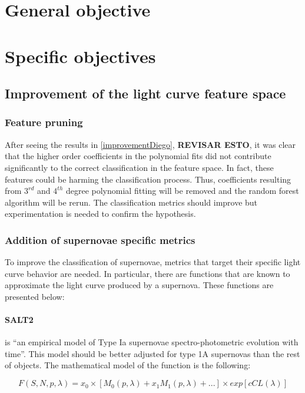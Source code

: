 \section{General objective}
\section{Specific objectives}

\subsection{Improvement of the light curve feature space}

\subsubsection{Feature pruning}

After seeing the results in \ref{improvementDiego}, \textbf{REVISAR ESTO}, it was clear that the higher order coefficients in the polynomial fits did not contribute significantly to the correct classification in the feature space. In fact, these features could be harming the classification process. Thus, coefficients resulting from $3^{rd}$ and $4^{th}$ degree polynomial fitting will be removed and the random forest algorithm will be rerun. The classification metrics should improve but experimentation is needed to confirm the hypothesis.  

\subsubsection{Addition of supernovae specific metrics}

To improve the classification of supernovae, metrics that target their specific light curve behavior are needed. In particular, there are functions that are known to approximate the light curve produced by a supernova. These functions are presented below: 

\paragraph{SALT2} is ``an empirical model of Type Ia supernovae spectro-photometric evolution with time''\cite{salt2}. This model should be better adjusted for type 1A supernovas than the rest of objects. The mathematical model of the function is the following\cite{salt2}:

\[
  F(S,N,p,\lambda) = x_0 \times [M_0(p,\lambda)+x_1M_1(p,\lambda)+...]\times exp[cCL(\lambda)]
\]

